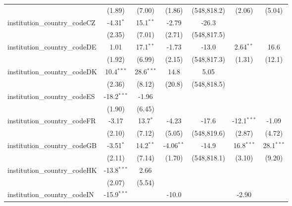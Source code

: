 \begin{tabular}{lcccccc}
                                         & (1.89)        & (7.00)        & (1.86)        & (548,818.2)   & (2.06)        & (5.04)\\   
   institution\_country\_codeCZ          & -4.31$^{*}$   & 15.1$^{**}$   & -2.79         & -26.3         &               &   \\   
                                         & (2.35)        & (7.01)        & (2.71)        & (548,817.5)   &               &   \\   
   institution\_country\_codeDE          & 1.01          & 17.1$^{**}$   & -1.73         & -13.0         & 2.64$^{**}$   & 16.6\\   
                                         & (1.92)        & (6.99)        & (2.15)        & (548,817.3)   & (1.31)        & (12.1)\\   
   institution\_country\_codeDK          & 10.4$^{***}$  & 28.6$^{***}$  & 14.8          & 5.05          &               &   \\   
                                         & (2.36)        & (8.12)        & (20.8)        & (548,818.5)   &               &   \\   
   institution\_country\_codeES          & -18.2$^{***}$ & -1.96         &               &               &               &   \\   
                                         & (1.90)        & (6.45)        &               &               &               &   \\   
   institution\_country\_codeFR          & -3.17         & 13.7$^{*}$    & -4.23         & -17.6         & -12.1$^{***}$ & -1.09\\   
                                         & (2.10)        & (7.12)        & (5.05)        & (548,819.6)   & (2.87)        & (4.72)\\   
   institution\_country\_codeGB          & -3.51$^{*}$   & 14.2$^{**}$   & -4.06$^{**}$  & -14.9         & 16.8$^{***}$  & 28.1$^{***}$\\   
                                         & (2.11)        & (7.14)        & (1.70)        & (548,818.1)   & (3.10)        & (9.20)\\   
   institution\_country\_codeHK          & -13.8$^{***}$ & 2.66          &               &               &               &   \\   
                                         & (2.07)        & (5.54)        &               &               &               &   \\   
   institution\_country\_codeIN          & -15.9$^{***}$ &               & -10.0         &               & -2.90         &   \\   

\end{tabular}
